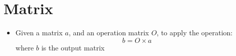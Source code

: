\chapter{Matrix}

\begin{itemize}
  \item Given a matrix $ a $, and an operation matrix $ O $, to apply
  the operation:
  \begin{equation}
    b = O \times a
  \end{equation}
  where $ b $ is the output matrix
\end{itemize}
